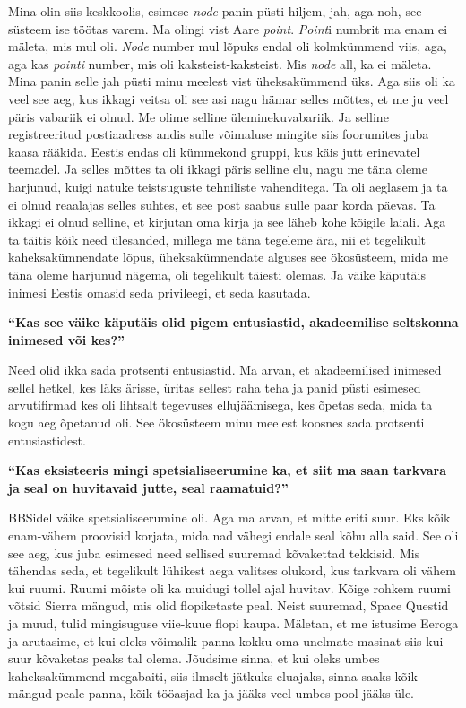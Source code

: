 Mina olin siis keskkoolis, esimese \emph{node} panin püsti hiljem, jah, aga 
noh, see süsteem ise töötas varem. Ma olingi vist Aare \emph{point}. 
\emph{Point}i numbrit ma enam ei mäleta, mis mul oli. \emph{Node} number mul 
lõpuks endal oli kolmkümmend viis, aga, aga kas \emph{pointi} number, mis oli 
kaksteist-kaksteist. Mis \emph{node} all, ka ei mäleta. Mina panin selle jah 
püsti minu meelest vist üheksakümmend üks. Aga siis oli ka veel see aeg, kus 
ikkagi veitsa oli see asi nagu hämar selles mõttes, et me ju veel päris 
vabariik ei olnud. Me olime selline üleminekuvabariik. Ja selline 
registreeritud postiaadress andis sulle  võimaluse mingite siis foorumites juba 
kaasa rääkida. Eestis endas oli kümmekond gruppi, kus käis jutt erinevatel 
teemadel. Ja selles mõttes ta oli ikkagi päris selline elu, nagu me täna oleme 
harjunud, kuigi natuke teistsuguste tehniliste vahenditega. Ta oli aeglasem ja 
ta ei olnud reaalajas selles suhtes, et see post saabus sulle paar korda 
päevas. Ta ikkagi ei olnud selline, et kirjutan oma kirja ja see läheb kohe 
kõigile laiali. Aga ta täitis kõik need ülesanded, millega me täna tegeleme 
ära, nii et tegelikult kaheksakümnendate lõpus, üheksakümnendate alguses see 
ökosüsteem, mida me täna oleme harjunud nägema, oli tegelikult täiesti olemas. 
Ja väike käputäis inimesi Eestis omasid seda privileegi, et seda kasutada. 

\textbf{\enquote{Kas see väike käputäis olid pigem entusiastid, akadeemilise 
seltskonna inimesed või kes?}}

Need olid ikka sada protsenti entusiastid. Ma arvan, et akadeemilised inimesed 
sellel hetkel, kes läks ärisse, üritas sellest raha teha ja panid püsti 
esimesed arvutifirmad kes oli lihtsalt tegevuses  ellujäämisega, kes õpetas 
seda, mida ta kogu aeg õpetanud oli. See ökosüsteem minu meelest koosnes sada 
protsenti entusiastidest.

\textbf{\enquote{Kas eksisteeris mingi spetsialiseerumine ka, et siit ma saan 
tarkvara ja seal on huvitavaid jutte, seal raamatuid?}}

BBSidel väike spetsialiseerumine oli. Aga ma arvan, et mitte eriti suur. Eks 
kõik enam-vähem proovisid korjata, mida nad vähegi endale seal kõhu alla said. 
See oli see aeg, kus juba esimesed need sellised suuremad kõvakettad tekkisid. 
Mis tähendas seda, et tegelikult lühikest aega valitses olukord, kus tarkvara 
oli vähem kui ruumi. Ruumi mõiste oli ka muidugi tollel ajal huvitav. Kõige 
rohkem ruumi võtsid Sierra mängud, mis olid flopiketaste peal. Neist suuremad, Space 
Questid ja muud, tulid mingisuguse viie-kuue flopi 
kaupa. Mäletan, et me istusime Eeroga ja arutasime, et 
kui oleks võimalik panna kokku oma unelmate masinat siis kui suur kõvaketas 
peaks tal olema. Jõudsime sinna, et kui oleks umbes kaheksakümmend megabaiti, 
siis ilmselt jätkuks eluajaks, sinna saaks kõik mängud peale panna, kõik 
tööasjad ka ja jääks veel umbes pool jääks üle.


